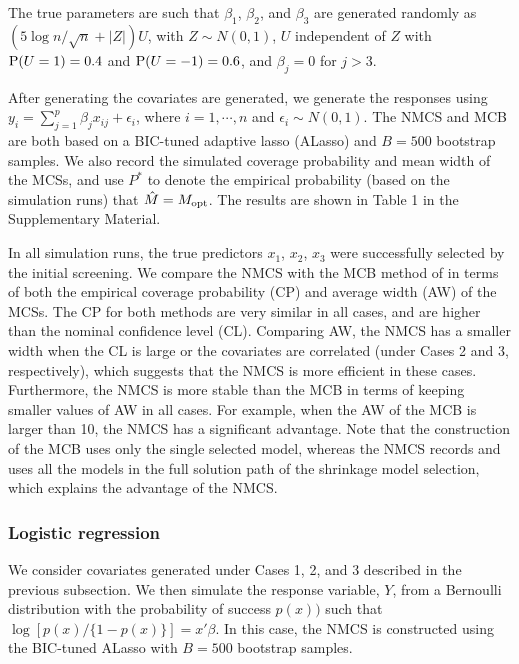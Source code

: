 \documentclass[12pt]{article} %
\theoremstyle{definition}
\begin{document}
The true parameters are such that $\beta_1$, $\beta_2$, and $\beta_3$ are generated randomly as $(5\log n/\sqrt{n}+|Z|)U$, with $Z\sim N(0,1)$,
$U$ independent of $Z$ with ${\rm P}(U=1)=0.4$ and ${\rm P}(U=-1)=0.6$, and $\beta_j=0$ for $j>3$.

After generating the covariates are generated, we generate the responses using $y_i= \sum_{j=1}^p \beta_j x_{ij}+ \epsilon_{i}$, where $i=1, \cdots, n$ and $\epsilon_i \sim N(0, 1)$. The NMCS and MCB are both based on a BIC-tuned adaptive lasso (ALasso) and $B=500$ bootstrap samples. We also record the simulated coverage probability and mean width of the MCSs, and use $P^{*}$ to denote the empirical probability (based on the simulation runs) that $\hat{M}=M_{\rm opt}$. The results are shown in Table 1 in the Supplementary Material. 

In all simulation runs, the true predictors $x_1$, $x_2$, $x_3$ were successfully selected by the initial screening. We compare the NMCS with the MCB method of \citet{Li2019} in terms of both the empirical coverage probability (CP) and average width (AW) of the MCSs. The CP for both methods are very similar in all cases, and are higher than the nominal confidence level (CL). Comparing AW, the NMCS has a smaller width when the CL is large or the covariates are correlated (under Cases 2 and 3, respectively), which suggests that the NMCS is more efficient in these cases. Furthermore, the NMCS is more 
stable than the MCB in terms of keeping smaller values of AW in all cases. For example, when the AW of the MCB is larger than 10, the NMCS has a significant advantage. 
Note that the construction of the MCB uses only the single selected model, whereas the NMCS records and uses all the models in the full solution path of the shrinkage model selection, which explains the advantage of the NMCS. 



\subsubsection{Logistic regression}

We consider covariates generated under Cases 1, 2, and 3 described in the previous subsection. We then simulate the response variable, $Y$, from a Bernoulli distribution with the probability of success $p(x))$ such that $\log[p(x)/\{1-p(x)\}]=x'\beta$. In this case, the NMCS is constructed using the BIC-tuned ALasso with $B=500$ bootstrap samples.
\end{document}
